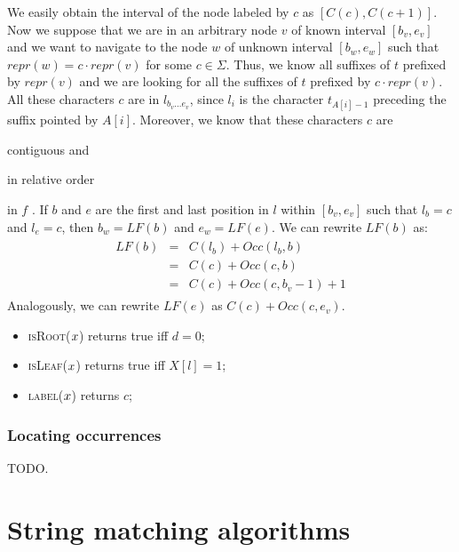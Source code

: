 We easily obtain the interval of the node labeled by $c$ as $[C(c),C(c+1)]$.
Now we suppose that we are in an arbitrary node $v$ of known interval $[b_v, e_v]$ and we want to navigate to the node $w$ of unknown interval $[b_w, e_w]$ such that $repr(w)=c \cdot repr(v)$ for some $c \in \Sigma$.
Thus, we know all suffixes of $t$ prefixed by $repr(v)$ and we are looking for all the suffixes of $t$ prefixed by $c \cdot repr(v)$.
All these characters $c$ are in $l_{b_v \dots e_v}$, since $l_i$ is the character $t_{A[i] - 1}$ preceding the suffix pointed by $A[i]$.
Moreover, we know that these characters $c$ are
\begin{inparaenum}[(i)]
\item contiguous and
\item in relative order
\end{inparaenum}
in $f$ \citep{Ferragina2000}.
If $b$ and $e$ are the first and last position in $l$ within $[b_v, e_v]$ such that $l_b = c$ and $l_e = c$, then $b_w = LF(b)$ and $e_w = LF(e)$.
We can rewrite $LF(b)$ as:
\begin{eqnarray}
\begin{array}{lcl}
LF(b) &=& C(l_b) + Occ(l_b, b)\\
 	  &=& C(c) + Occ(c, b)\\
	  &=& C(c) + Occ(c, b_v - 1) + 1
\end{array}
\end{eqnarray}
Analogously, we can rewrite $LF(e)$ as $C(c) + Occ(c, e_v)$.

\begin{itemize}
\item \textsc{isRoot}($x$) returns true iff $d = 0$;
\item \textsc{isLeaf}($x$) returns true iff $X[l] = 1$;
\item \textsc{label}($x$) returns $c$;
\end{itemize}

\subsubsection{Locating occurrences}

TODO.

\section{String matching algorithms}

